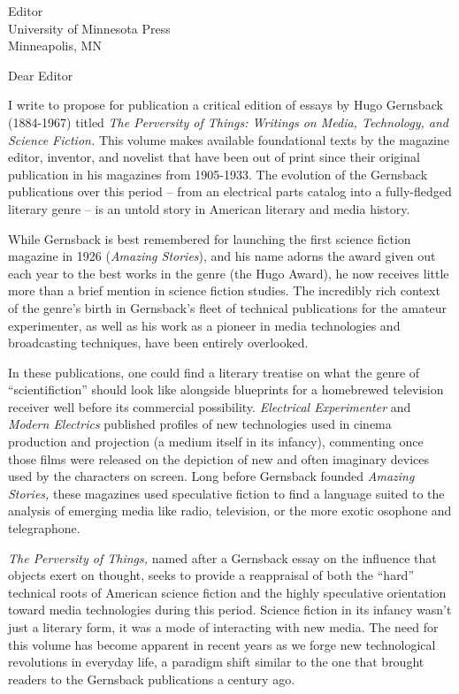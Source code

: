 \documentclass[a4paper,12pt]{letter}
\begin{document}
\begin{letter}{Editor \\ University of Minnesota Press \\ Minneapolis, MN}

\opening{Dear Editor} %

I write to propose for publication a critical edition of essays by Hugo
Gernsback (1884-1967) titled \emph{The Perversity of Things: Writings on
Media, Technology, and Science Fiction.} This volume makes available
foundational texts by the magazine editor, inventor, and novelist that
have been out of print since their original publication in his magazines
from 1905-1933. The evolution of the Gernsback publications over this
period -- from an electrical parts catalog into a fully-fledged literary
genre -- is an untold story in American literary and media history.

While Gernsback is best remembered for launching the first science
fiction magazine in 1926 (\emph{Amazing Stories}), and his name adorns
the award given out each year to the best works in the genre (the Hugo
Award), he now receives little more than a brief mention in science
fiction studies. The incredibly rich context of the genre's birth in
Gernsback's fleet of technical publications for the amateur
experimenter, as well as his work as a pioneer in media technologies and
broadcasting techniques, have been entirely overlooked.

In these publications, one could find a literary treatise on what the
genre of ``scientifiction'' should look like alongside blueprints for a
homebrewed television receiver well before its commercial possibility.
\emph{Electrical Experimenter} and \emph{Modern Electrics} published
profiles of new technologies used in cinema production and projection (a
medium itself in its infancy), commenting once those films were released
on the depiction of new and often imaginary devices used by the
characters on screen. Long before Gernsback founded \emph{Amazing
Stories,} these magazines used speculative fiction to find a language
suited to the analysis of emerging media like radio, television, or the
more exotic osophone and telegraphone.

\emph{The Perversity of Things,} named after a Gernsback essay on the
influence that objects exert on thought, seeks to provide a reappraisal
of both the ``hard'' technical roots of American science fiction and the
highly speculative orientation toward media technologies during this
period. Science fiction in its infancy wasn't just a literary form, it
was a mode of interacting with new media. The need for this volume has
become apparent in recent years as we forge new technological
revolutions in everyday life, a paradigm shift similar to the one that
brought readers to the Gernsback publications a century ago.


\end{letter}
\end{document}
